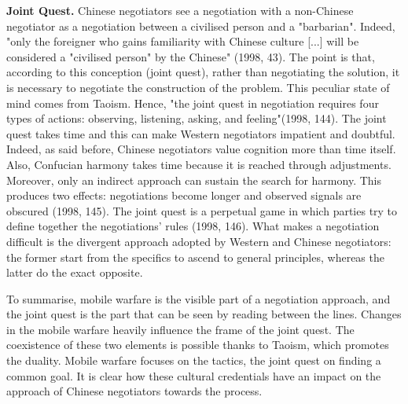 \documentclass[../main.tex]{subfiles}
\begin{document}
\textbf{Joint Quest.} Chinese negotiators see a negotiation with a non-Chinese negotiator as a negotiation between a civilised person and a "barbarian". Indeed, "only the foreigner who gains familiarity with Chinese culture [...] will be considered a "civilised person" by the Chinese" (1998, 43). The point is that, according to this conception (joint quest), rather than negotiating the solution, it is necessary to negotiate the construction of the problem. This peculiar state of mind comes from Taoism. Hence, "the joint quest in negotiation requires four types of actions: observing, listening, asking, and feeling"(1998, 144). The joint quest takes time and this can make Western negotiators impatient and doubtful. Indeed, as said before, Chinese negotiators value cognition more than time itself. Also, Confucian harmony takes time because it is reached through adjustments. Moreover, only an indirect approach can sustain the search for harmony. This produces two effects: negotiations become longer and observed signals are obscured (1998, 145). The joint quest is a perpetual game in which parties try to define together the negotiations' rules (1998, 146). What makes a negotiation difficult is the divergent approach adopted by Western and Chinese negotiators: the former start from the specifics to ascend to general principles, whereas the latter do the exact opposite.

To summarise, mobile warfare is the visible part of a negotiation approach, and the joint quest is the part that can be seen by reading between the lines. Changes in the mobile warfare heavily influence the frame of the joint quest. The coexistence of these two elements is possible thanks to Taoism, which promotes the duality. Mobile warfare focuses on the tactics, the joint quest on finding a common goal. It is clear how these cultural credentials have an impact on the approach of Chinese negotiators towards the process.\\


\end{document}
